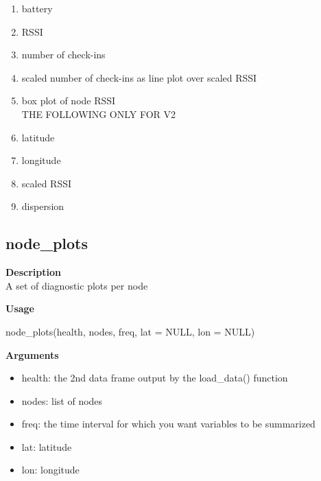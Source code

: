 \documentclass[
]{book}
\newenvironment{Shaded}{\begin{snugshade}}{\end{snugshade}}
\newcommand{\AttributeTok}[1]{\textcolor[rgb]{0.77,0.63,0.00}{#1}}
\newcommand{\ConstantTok}[1]{\textcolor[rgb]{0.00,0.00,0.00}{#1}}
\newcommand{\FunctionTok}[1]{\textcolor[rgb]{0.00,0.00,0.00}{#1}}
\newcommand{\NormalTok}[1]{#1}
\providecommand{\tightlist}{%
  \setlength{\itemsep}{0pt}\setlength{\parskip}{0pt}}
\begin{document}
\begin{enumerate}
\def\labelenumi{\arabic{enumi}.}
\tightlist
\item
  battery\\
\item
  RSSI\\
\item
  number of check-ins\\
\item
  scaled number of check-ins as line plot over scaled RSSI\\
\item
  box plot of node RSSI\\
  THE FOLLOWING ONLY FOR V2\\
\item
  latitude\\
\item
  longitude\\
\item
  scaled RSSI\\
\item
  dispersion
\end{enumerate}

\hypertarget{node_plots}{%
\subsection{node\_plots}\label{node_plots}}

\textbf{Description}\\
A set of diagnostic plots per node

\textbf{Usage}

\begin{Shaded}
\begin{Highlighting}[]
\FunctionTok{node\_plots}\NormalTok{(health, nodes, freq, }\AttributeTok{lat =} \ConstantTok{NULL}\NormalTok{, }\AttributeTok{lon =} \ConstantTok{NULL}\NormalTok{)}
\end{Highlighting}
\end{Shaded}

\textbf{Arguments}

\begin{itemize}
\tightlist
\item
  health: the 2nd data frame output by the load\_data() function\\
\item
  nodes: list of nodes\\
\item
  freq: the time interval for which you want variables to be summarized\\
\item
  lat: latitude\\
\item
  lon: longitude
\end{itemize}
\end{document}
